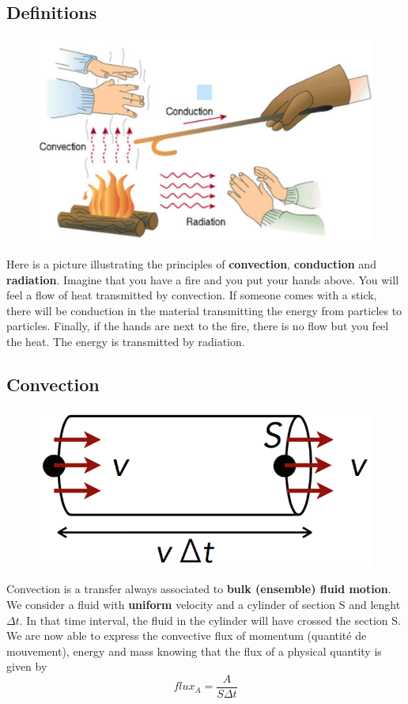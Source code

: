 \subsection{Definitions}
\begin{figure}
	\vspace{-5mm}
	\includegraphics[scale=0.3]{ch1/1}
\end{figure}
Here is a picture illustrating the principles of \textbf{convection}, \textbf{conduction} and \textbf{radiation}. Imagine that you have a fire and you put your hands above. You will feel a flow of heat transmitted by convection. If someone comes with a stick, there will be conduction in the material transmitting the energy from particles to particles. Finally, if the hands are next to the fire, there is no flow but you feel the heat. The energy is transmitted by radiation. 
	
\newpage

\subsection{Convection}
\begin{figure}
	\vspace{-5mm}
	\includegraphics[scale=0.3]{ch1/2}
\end{figure}
Convection is a transfer always associated to \textbf{bulk (ensemble) fluid motion}. We consider a fluid with \textbf{uniform} velocity and a cylinder of section S and lenght $\Delta t$. In that time interval, the fluid in the cylinder will have crossed the section S. We are now able to express the convective flux of momentum (quantité de mouvement), energy and mass knowing that the flux of a physical quantity is given by 
\begin{equation}
	flux _A = \frac{A}{S\Delta t}
	\label{equation:1.5}
\end{equation}
	
